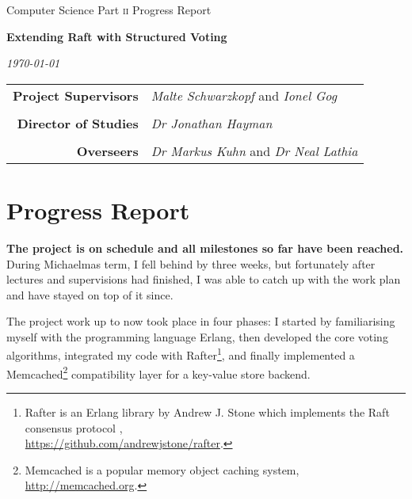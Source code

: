 \documentclass[11pt]{scrartcl}
\begin{document}
\thispagestyle{empty}

 \medskip
{} \medskip
{}

\vfil

\centerline{\large Computer Science Part \textsc{ii} Progress Report} \vspace{0.4in}
\centerline{\Large\bf Extending Raft with Structured Voting} \vspace{0.3in}
\centerline{\large\it \today}

\vfil

\begin{center}
\begin{tabularx}{316pt}{rX}
\textbf{Project Supervisors} & \textit{Malte Schwarzkopf} and \textit{Ionel Gog} \\ \\
\textbf{Director of Studies} & \textit{Dr Jonathan Hayman} \\ \\
\textbf{Overseers} & \textit{Dr Markus Kuhn} and \textit{Dr Neal Lathia}
\end{tabularx}
\end{center}

\newpage

\section{Progress Report%
  \label{progress-report}%
}

\textbf{The project is on schedule and all milestones so far have been reached.} During Michaelmas term, I fell behind by three weeks, but fortunately after lectures and supervisions had finished, I was able to catch up with the work plan and have stayed on top of it since.

The project work up to now took place in four phases: I started by familiarising myself with the programming language Erlang, then developed the core voting algorithms, integrated my code with Rafter\footnote{Rafter is an Erlang library by Andrew J. Stone which implements the Raft consensus protocol \cite{raft},\\\url{https://github.com/andrewjstone/rafter}.}, and finally implemented a Memcached\footnote{Memcached is a popular memory object caching system, \url{http://memcached.org}.} compatibility layer for a key-value store backend.
\end{document}
